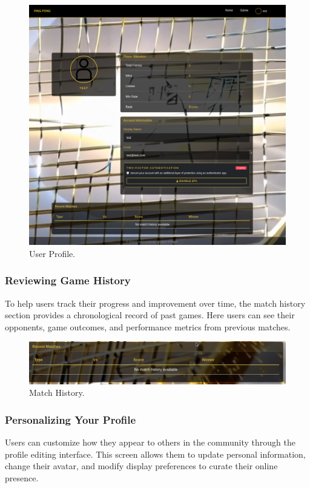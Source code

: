 \begin{figure}[H]
    \centering
    \includegraphics[width=0.65\linewidth]{Figures/images/new_images/ProfilePage.png}
    \caption{User Profile.} %
    \label{fig:profile-page-journey}
\end{figure}

\subsubsection{Reviewing Game History} To help users track their progress and improvement over time, the match history section provides a chronological record of past games. Here users can see their opponents, game outcomes, and performance metrics from previous matches.

\begin{figure}[H]
    \centering
    \includegraphics[width=0.65\linewidth]{Figures/images/new_images/History.png}
    \caption{Match History.} %
    \label{fig:match-history-journey}
\end{figure}

\subsubsection{Personalizing Your Profile} Users can customize how they appear to others in the community through the profile editing interface. This screen allows them to update personal information, change their avatar, and modify display preferences to curate their online presence.

